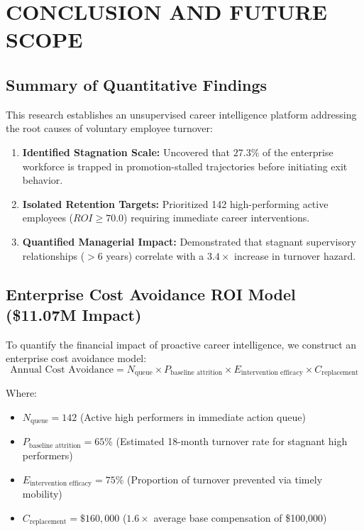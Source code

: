 \documentclass[12pt,a4paper,oneside]{report}
\begin{document}
\clearpage
\chapter{CONCLUSION AND FUTURE SCOPE}

\section{Summary of Quantitative Findings}
This research establishes an unsupervised career intelligence platform addressing the root causes of voluntary employee turnover:
\begin{enumerate}
  \item \textbf{Identified Stagnation Scale:} Uncovered that $27.3\%$ of the enterprise workforce is trapped in promotion-stalled trajectories before initiating exit behavior.
  \item \textbf{Isolated Retention Targets:} Prioritized 142 high-performing active employees ($ROI \ge 70.0$) requiring immediate career interventions.
  \item \textbf{Quantified Managerial Impact:} Demonstrated that stagnant supervisory relationships ($>6$ years) correlate with a $3.4\times$ increase in turnover hazard.
\end{enumerate}

\section{Enterprise Cost Avoidance ROI Model (\$11.07M Impact)}
To quantify the financial impact of proactive career intelligence, we construct an enterprise cost avoidance model:
\begin{equation}
\text{Annual Cost Avoidance} = N_{\text{queue}} \times P_{\text{baseline attrition}} \times E_{\text{intervention efficacy}} \times C_{\text{replacement}}
\end{equation}

Where:
\begin{itemize}
  \item $N_{\text{queue}} = 142$ (Active high performers in immediate action queue)
  \item $P_{\text{baseline attrition}} = 65\%$ (Estimated 18-month turnover rate for stagnant high performers)
  \item $E_{\text{intervention efficacy}} = 75\%$ (Proportion of turnover prevented via timely mobility)
  \item $C_{\text{replacement}} = \$160,000$ ($1.6\times$ average base compensation of \$100,000)
\end{itemize}
\end{document}
